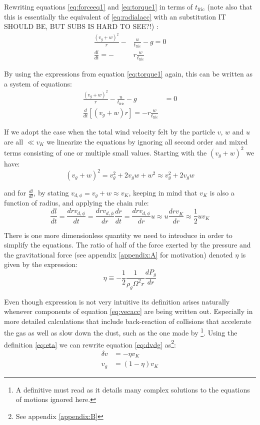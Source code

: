 \documentclass[12pt]{article}
\begin{document}
Rewriting equations \ref{eq:forceeq1} and \ref{eq:torque1} in terms of $t_{\mathrm{fric}}$ (note also that this is essentially the equivalent of \ref{eq:radialacc} with an substitution IT SHOULD BE, BUT SUBS IS HARD TO SEE?!) :
\begin{align}
    \label{eq:}
    \frac{(v_g+w)^2}{r} -& \frac{u}{t_{\mathrm{fric}}} - g = 0 \\
    \frac{dl}{dt} = -&r\frac{w}{t_{\mathrm{fric}}}
\end{align}

By using the expressions from equation \ref{eq:torque1} again, this can be written as a system of equations:
\begin{align}
    \label{eq:forceeq2}
    \frac{(v_g+w)^2}{r} - \frac{u}{t_{\mathrm{fric}}} - g &= 0 \\
    \label{eq:torque2}
    \frac{d}{dt}\left[(v_g+w)r\right] = -r\frac{w}{t_{\mathrm{fric}}}&
\end{align}

If we adopt the case when the total wind velocity felt by the particle $v$, $w$ and $u$ are all $\ll v_K$ we linearize the equations by ignoring all second order and mixed terms consisting of one or multiple small values. Starting with the $(v_g+w)^2$ we have:
$$ (v_g+w)^2 = v_g^2 + 2v_gw + w^2 \approx v_g^2 + 2v_gw $$

\noindent and for $\frac{dl}{dt}$, by stating $v_{d, \phi}=v_g+w \approx v_K$, keeping in mind that $v_K$ is also a function of radius, and applying the chain rule:
$$\frac{dl}{dt} = \frac{drv_{d, \phi}}{dt} = \frac{drv_{d, \phi}}{dr}\frac{dr}{dt} = \frac{drv_{d, \phi}}{dr}u \approx u\frac{drv_K}{dr} \approx \frac{1}{2}uv_K$$ 

There is one more dimensionless quantity we need to introduce in order to simplify the equations. The ratio of half of the force exerted by the pressure and the gravitational force (see appendix \ref{appendix:A} for motivation) denoted $\eta$ is given by the expression: 
\begin{equation}
   \label{eq:eta}
    \eta \equiv -\frac{1}{2} \frac{1}{\rho_g \Omega^2 r } \frac{dP_g}{dr}
\end{equation}

Even though expression is not very intuitive its definition arises naturally whenever components of equation \ref{eq:vecacc} are being written out. Especially in more detailed calculations that include back-reaction of collisions that accelerate the gas as well as slow down the dust, such as the one made by \citet{Nakagawa86}\footnote{A definitive must read as it details many complex solutions to the equations of motions ignored here.}. Using the definition \ref{eq:eta} we can rewrite equation \ref{eq:dvdg} as\footnote{See appendix \ref{appendix:B}}: 
\begin{align}
    \delta v &= - \eta v_K \\
    v_g &= (1-\eta)v_K
\end{align}
\end{document}
